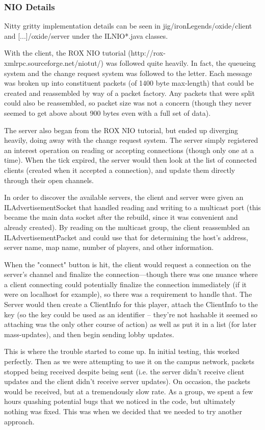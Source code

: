 \documentclass[letterpaper,11pt,twoside]{article}
\begin{document}
\subsubsection{NIO Details}
Nitty gritty implementation details can be seen in jig/ironLegends/oxide/client and [...]/oxide/server under the ILNIO{*}.java classes.

With the client, the ROX NIO tutorial (http://rox-xmlrpc.sourceforge.net/niotut/) was followed quite heavily. In fact, the queueing system and the change request system was followed to the letter. Each message was broken up into constituent packets (of 1400 byte max-length) that could be created and reassembled by way of a packet factory. Any packets that were split could also be reassembled, so packet size was not a concern (though they never seemed to get above about 900 bytes even with a full set of data).

The server also began from the ROX NIO tutorial, but ended up diverging heavily, doing away with the change request system. The server simply registered an interest operation on reading or accepting connections (though only one at a time). When the tick expired, the server would then look at the list of connected clients (created when it accepted a connection), and update them directly through their open channels.

In order to discover the available servers, the client and server were given an ILAdvertisementSocket that handled reading and writing to a multicast port (this became the main data socket after the rebuild, since it was convenient and already created). By reading on the multicast group, the client reassembled an ILAdvertisementPacket and could use that for determining the host's address, server name, map name, number of players, and other information.

When the "connect" button is hit, the client would request a connection on the server's channel and finalize the connection---though there was one nuance where a client connecting could potentially finalize the connection immediately (if it were on localhost for example), so there was a requirement to handle that. The Server would then create a ClientInfo for this player, attach the ClientInfo to the key (so the key could be used as an identifier -- they're not hashable it seemed so attaching was the only other course of action) as well as put it in a list (for later mass-updates), and then begin sending lobby updates.

This is where the trouble started to come up. In initial testing, this worked perfectly. Then as we were attempting to use it on the campus network, packets stopped being received despite being sent (i.e. the server didn't receive client updates and the client didn't receive server updates). On occasion, the packets would be received, but at a tremendously slow rate. As a group, we spent a few hours quashing potential bugs that we noticed in the code, but ultimately nothing was fixed. This was when we decided that we needed to try another approach.
\end{document}
